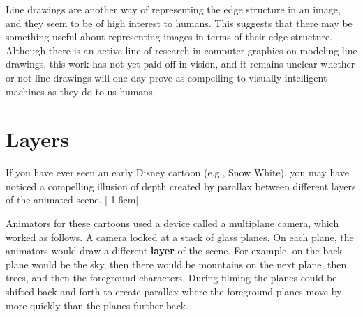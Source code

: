 Line drawings are another way of representing the edge structure in an image, and they seem to be of high interest to humans. This suggests that there may be something useful about representing images in terms of their edge structure. Although there is an active line of research in computer graphics on modeling line drawings, this work has not yet paid off in vision, and it remains unclear whether or not line drawings will one day prove as compelling to visually intelligent machines as they do to us humans.


\section{Layers}
If you have ever seen an early Disney cartoon (e.g., Snow White), you may have noticed a compelling illusion of depth created by parallax between different layers of the animated scene.
[-1.6cm]

Animators for these cartoons used a device called a multiplane camera, which worked as follows. A camera looked at a stack of glass planes. On each plane, the animators would draw a different \textbf{layer} of the scene. For example, on the back plane would be the sky, then there would be mountains on the next plane, then trees, and then the foreground characters. During filming the planes could be shifted back and forth to create parallax where the foreground planes move by more quickly than the planes further back.

